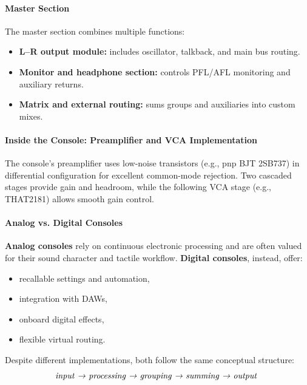 \paragraph{Master Section}
The master section combines multiple functions:
\begin{itemize}
  \item \textbf{L–R output module:} includes oscillator, talkback, and main bus routing.
  \item \textbf{Monitor and headphone section:} controls PFL/AFL monitoring and auxiliary returns.
  \item \textbf{Matrix and external routing:} sums groups and auxiliaries into custom mixes.
\end{itemize}

\paragraph{Inside the Console: Preamplifier and VCA Implementation}
The console’s preamplifier uses low-noise transistors (e.g., pnp BJT 2SB737) in differential configuration for excellent common-mode rejection.  
Two cascaded stages provide gain and headroom, while the following VCA stage (e.g., THAT2181) allows smooth gain control.

\paragraph{Analog vs. Digital Consoles}
\textbf{Analog consoles} rely on continuous electronic processing and are often valued for their sound character and tactile workflow.  
\textbf{Digital consoles}, instead, offer:
\begin{itemize}
  \item recallable settings and automation,
  \item integration with DAWs,
  \item onboard digital effects,
  \item flexible virtual routing.
\end{itemize}

Despite different implementations, both follow the same conceptual structure:  
\[
\text{\emph{input → processing → grouping → summing → output}
}
\]



